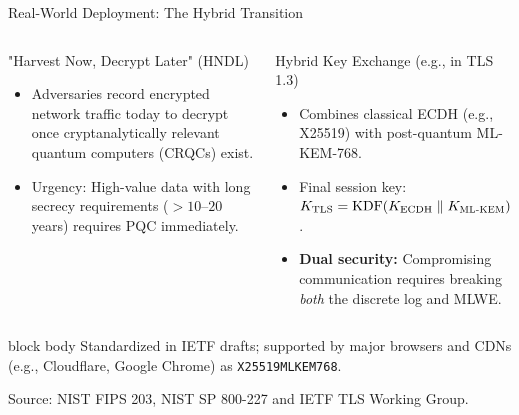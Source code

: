 \documentclass[aspectratio=169,11pt]{beamer}
\newcommand{\source}[1]{\par\vspace{-0.15cm}\hfill{\fontsize{4.5}{5.2}\selectfont\color{Slate!65}Source: NIST FIPS 203, #1.}}
\newcommand{\KEM}{\textsc{ML-KEM}}
\begin{document}
\begin{frame}{Real-World Deployment: The Hybrid Transition}
  \begin{columns}[T,onlytextwidth]
      \begin{block}{"Harvest Now, Decrypt Later" (HNDL)}
        \footnotesize
        \begin{itemize}
          \setlength{\itemsep}{0.25em}
          \item Adversaries record encrypted network traffic today to decrypt once cryptanalytically relevant quantum computers (CRQCs) exist.
          \item Urgency: High-value data with long secrecy requirements ($> 10\text{--}20$ years) requires PQC immediately.
        \end{itemize}
      \end{block}

      \begin{block}{Hybrid Key Exchange (e.g., in TLS 1.3)}
        \footnotesize
        \begin{itemize}
          \setlength{\itemsep}{0.25em}
          \item Combines classical ECDH (e.g., X25519) with post-quantum ML-KEM-768.
          \item Final session key: $K_{\mathrm{TLS}} = \mathrm{KDF}(K_{\mathrm{ECDH}} \parallel K_{\KEM})$.
          \item \textbf{Dual security:} Compromising communication requires breaking \textit{both} the discrete log and MLWE.
        \end{itemize}
      \end{block}
  \end{columns}
  \vspace{0.15cm}
  \begin{beamercolorbox}[rounded=true,sep=0.35em,wd=\linewidth,center]{block body}
    \scriptsize
    Standardized in IETF drafts; supported by major browsers and CDNs (e.g., Cloudflare, Google Chrome) as \texttt{X25519MLKEM768}.
  \end{beamercolorbox}
  \source{NIST SP 800-227 and IETF TLS Working Group}
\end{frame}
\end{document}
